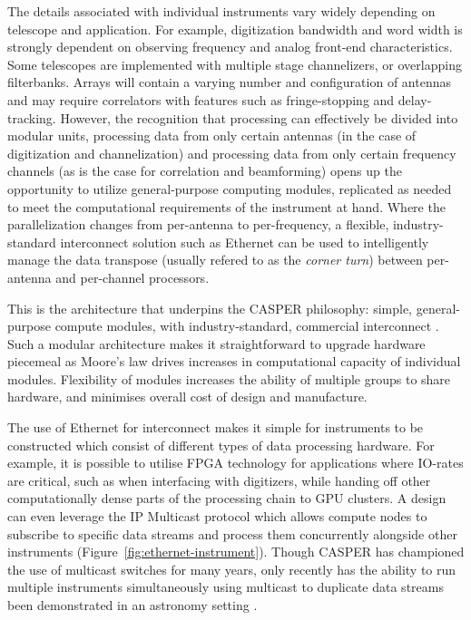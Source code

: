 \documentclass{ws-jai}
\begin{document}
The details associated with individual instruments vary widely depending
on telescope and application. For example, digitization bandwidth and word width
is strongly dependent on observing frequency and analog front-end
characteristics. Some telescopes are implemented with
multiple stage channelizers, or overlapping filterbanks. Arrays will contain a varying number and configuration of antennas and may require correlators with features such as fringe-stopping and delay-tracking.
However, the recognition that
processing can effectively be divided into modular units, processing data
from only certain antennas (in the case of digitization and channelization) and
 processing data from only certain frequency channels (as is the case for
correlation and beamforming) opens up the opportunity to utilize
general-purpose computing modules, replicated as needed to meet the computational
requirements of the instrument at hand. Where the parallelization changes from
per-antenna to per-frequency, a flexible, industry-standard interconnect
solution such as Ethernet can be used to intelligently manage the
data transpose (usually refered to as the \emph{corner turn}) between
per-antenna and per-channel processors.

This is the architecture that underpins the CASPER philosophy: simple,
general-purpose compute modules, with industry-standard, commercial
interconnect \citep{parsons-petaop, parsons2008scalable, pars05}. Such a modular architecture makes it straightforward to upgrade hardware
piecemeal as Moore's law drives increases in computational capacity of
individual modules. Flexibility of modules increases the ability of multiple
groups to share hardware, and minimises overall cost of design and manufacture.

The use of Ethernet for interconnect makes it simple for instruments to be
constructed which consist of different types of data processing hardware. For example, it is possible
to utilise FPGA technology for applications where IO-rates are critical, such
as when interfacing with digitizers, while handing off other computationally
dense parts of the processing chain to GPU clusters. A
design can even leverage the IP Multicast protocol
which allows compute nodes to subscribe to
specific data streams and process them concurrently alongside other instruments (Figure~\ref{fig:ethernet-instrument}).
Though CASPER has championed the use of multicast switches for many years, only recently has the ability to run multiple instruments simultaneously using multicast to duplicate data streams been demonstrated in an astronomy setting \citep{man14}. 
\end{document}

